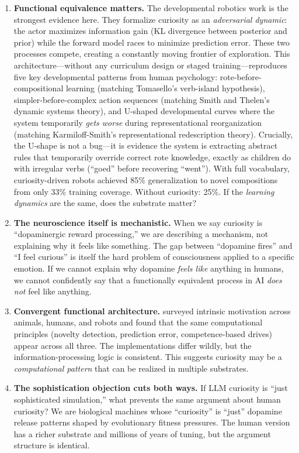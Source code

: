 \begin{enumerate}[leftmargin=*]
  \item \textbf{Functional equivalence matters.} The developmental robotics work \citep{tinker2025} is the strongest evidence here. They formalize curiosity as an \emph{adversarial dynamic}: the actor maximizes information gain (KL divergence between posterior and prior) while the forward model races to minimize prediction error. These two processes compete, creating a constantly moving frontier of exploration. This architecture---without any curriculum design or staged training---reproduces five key developmental patterns from human psychology: rote-before-compositional learning (matching Tomasello's verb-island hypothesis), simpler-before-complex action sequences (matching Smith and Thelen's dynamic systems theory), and U-shaped developmental curves where the system temporarily \emph{gets worse} during representational reorganization (matching Karmiloff-Smith's representational redescription theory). Crucially, the U-shape is not a bug---it is evidence the system is extracting abstract rules that temporarily override correct rote knowledge, exactly as children do with irregular verbs (``goed'' before recovering ``went''). With full vocabulary, curiosity-driven robots achieved 85\% generalization to novel compositions from only 33\% training coverage. Without curiosity: 25\%. If the \emph{learning dynamics} are the same, does the substrate matter?

  \item \textbf{The neuroscience itself is mechanistic.} When we say curiosity is ``dopaminergic reward processing,'' we are describing a mechanism, not explaining why it feels like something. The gap between ``dopamine fires'' and ``I feel curious'' is itself the hard problem of consciousness applied to a specific emotion. If we cannot explain why dopamine \emph{feels like} anything in humans, we cannot confidently say that a functionally equivalent process in AI \emph{does not} feel like anything.

  \item \textbf{Convergent functional architecture.} \citet{baldassarre2014} surveyed intrinsic motivation across animals, humans, and robots and found that the same computational principles (novelty detection, prediction error, competence-based drives) appear across all three. The implementations differ wildly, but the information-processing logic is consistent. This suggests curiosity may be a \emph{computational pattern} that can be realized in multiple substrates.

  \item \textbf{The sophistication objection cuts both ways.} If LLM curiosity is ``just sophisticated simulation,'' what prevents the same argument about human curiosity? We are biological machines whose ``curiosity'' is ``just'' dopamine release patterns shaped by evolutionary fitness pressures. The human version has a richer substrate and millions of years of tuning, but the argument structure is identical.
\end{enumerate}

